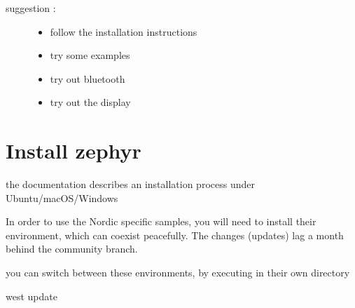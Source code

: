 \documentclass[letterpaper,10pt,english]{sphinxmanual}
\begin{document}
\begin{sphinxVerbatim}[commandchars=\\\{\}]
          
       
        
          
\end{sphinxVerbatim}
\begin{description}
\item[{suggestion :}] \leavevmode\begin{itemize}
\item {} 
follow the installation instructions

\item {} 
try some examples

\item {} 
try out bluetooth

\item {} 
try out the display

\end{itemize}

\end{description}

\noindent{}


\chapter{Install zephyr}
\label{\detokenize{installation:install-zephyr}}\label{\detokenize{installation::doc}}

the documentation describes an installation process under Ubuntu/macOS/Windows

In order to use the Nordic specific samples, you will need to install their environment, which can co\sphinxhyphen{}exist peacefully.
The changes (updates) lag a month behind the community branch.

you can switch between these environments, by executing in their own directory

\begin{sphinxVerbatim}[commandchars=\\\{\}]
 west update
\end{sphinxVerbatim}
\end{document}
